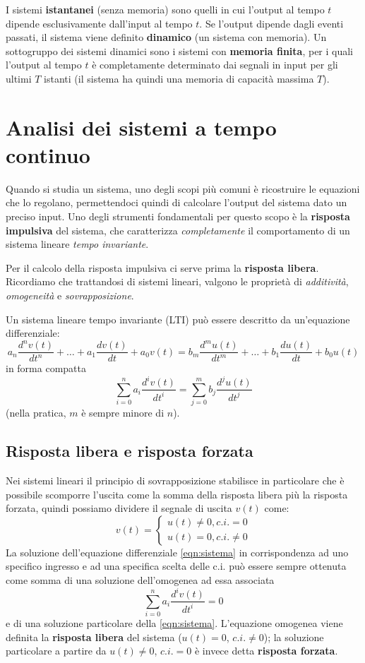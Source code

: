 \documentclass[a4paper, titlepage, oneside]{scrbook}
\begin{document}
I sistemi \textbf{istantanei} (senza memoria) sono quelli in cui l'output al tempo $t$ dipende esclusivamente dall'input al tempo $t$.
Se l'output dipende dagli eventi passati, il sistema viene definito \textbf{dinamico} (un sistema con memoria).
Un sottogruppo dei sistemi dinamici sono i sistemi con \textbf{memoria finita}, per i quali l'output al tempo $t$ è completamente determinato
dai segnali in input per gli ultimi $T$ istanti (il sistema ha quindi una memoria di capacità massima $T$).

\chapter{Analisi dei sistemi a tempo continuo}
Quando si studia un sistema, uno degli scopi più comuni è ricostruire le equazioni che lo regolano, permettendoci quindi di calcolare l'output del sistema dato un preciso input.
Uno degli strumenti fondamentali per questo scopo è la \textbf{risposta impulsiva} del sistema, che caratterizza \textit{completamente} il comportamento di un sistema lineare \textit{tempo invariante}.

Per il calcolo della risposta impulsiva ci serve prima la \textbf{risposta libera}.
Ricordiamo che trattandosi di sistemi lineari, valgono le proprietà di \textit{additività}, \textit{omogeneità} e \textit{sovrapposizione}.

Un sistema lineare tempo invariante (LTI) può essere descritto da un'equazione differenziale:
$$
	a_n\frac{d^nv(t)}{dt^n} + \ldots + a_1\frac{dv(t)}{dt} + a_0v(t) = b_m\frac{d^mu(t)}{dt^m} + \ldots + b_1\frac{du(t)}{dt} + b_0u(t)
$$
in forma compatta
\begin{equation}
	\sum_{i=0}^{n}a_i\frac{d^iv(t)}{dt^i} = \sum_{j=0}^{m}b_j\frac{d^ju(t)}{dt^j}
	\label{eqn:sistema}
\end{equation}
(nella pratica, $m$ è sempre minore di $n$).

\section{Risposta libera e risposta forzata}
Nei sistemi lineari il principio di sovrapposizione stabilisce in particolare che è possibile scomporre l'uscita come la somma della risposta libera più la risposta forzata, quindi possiamo dividere il segnale di uscita $v(t)$ come:
$$
	v(t)=
		\begin{cases}
		u(t) \ne 0, c.i. = 0\\
		u(t) = 0, c.i. \ne 0
		\end{cases}
$$
La soluzione dell'equazione differenziale \ref{eqn:sistema} in corrispondenza ad uno specifico ingresso e ad una specifica scelta delle c.i. può essere sempre ottenuta come somma di una soluzione dell'omogenea ad essa associata
\begin{equation}
	\sum_{i=0}^{n}a_i\frac{d^iv(t)}{dt^i}=0
	\label{eqn:omogenea_associata}
\end{equation}
e di una soluzione particolare della \ref{eqn:sistema}.
L'equazione omogenea viene definita la \textbf{risposta libera} del sistema ($u(t)=0$, $c.i.\ne 0$); la soluzione particolare a partire da $u(t)\ne 0$, $c.i.=0$ è invece detta \textbf{risposta forzata}.
\end{document}
